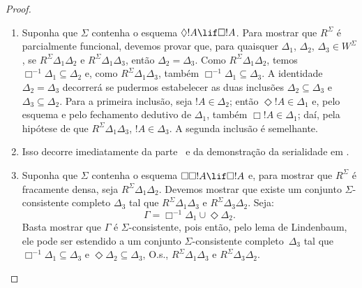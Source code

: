 \documentclass[../../../include/open-logic-section]{subfiles}
\begin{document}
\begin{proof}
  \begin{enumerate}
  \item Suponha que $\Sigma$ contenha o esquema $\Diamond !A \lif
    \Box !A$. Para mostrar que $R^\Sigma$ é parcialmente funcional,
    devemos provar que, para quaisquer $\Delta_1$, $\Delta_2$,
    $\Delta_3 \in W^\Sigma$, se $R^\Sigma \Delta_1\Delta_2$ e
    $R^\Sigma \Delta_1\Delta_3$, então $\Delta_2=\Delta_3$. Como
    $R^\Sigma \Delta_1\Delta_2$, temos
    $\Box^{-1}\Delta_1 \subseteq \Delta_2$ e, como
    $R^\Sigma \Delta_1\Delta_3$, também
    $\Box^{-1}\Delta_1 \subseteq \Delta_3$. A identidade
    $\Delta_2=\Delta_3$ decorrerá se pudermos estabelecer as duas
    inclusões $\Delta_2 \subseteq \Delta_3$ e
    $\Delta_3 \subseteq \Delta_2$. Para a primeira inclusão, seja
    $!A \in \Delta_2$; então $\Diamond!A \in \Delta_1$ e, pelo esquema
    e pelo fechamento dedutivo de $\Delta_1$, também
    $\Box!A \in \Delta_1$; daí, pela hipótese de que
    $R^\Sigma \Delta_1\Delta_3$, $!A \in \Delta_3$. A segunda inclusão
    é semelhante.

  \item Isso decorre imediatamente da parte~
    e da demonstração da serialidade em .

  \item Suponha que $\Sigma$ contenha o esquema
    $\Box\Box!A \lif \Box!A$ e, para mostrar que $R^\Sigma$ é fracamente
    densa, seja $R^\Sigma \Delta_1\Delta_2$. Devemos mostrar que existe
    um conjunto $\Sigma$-consistente completo $\Delta_3$ tal que
    $R^\Sigma \Delta_1\Delta_3$ e $R^\Sigma \Delta_3\Delta_2$. Seja:
    \[
    \Gamma = \Box^{-1}\Delta_1 \cup \Diamond\Delta_2.
    \]
    Basta mostrar que $\Gamma$ é $\Sigma$-consistente, pois então,
    pelo lema de Lindenbaum, ele pode ser estendido a um conjunto
    $\Sigma$-consistente completo~$\Delta_3$ tal que
    $\Box^{-1}\Delta_1 \subseteq \Delta_3$ e
    $\Diamond\Delta_2 \subseteq \Delta_3$, O.s.\@,
    $R^\Sigma \Delta_1\Delta_3$ e $R^\Sigma
    \Delta_3\Delta_2$.


\end{enumerate}
\end{proof}
\end{document}
